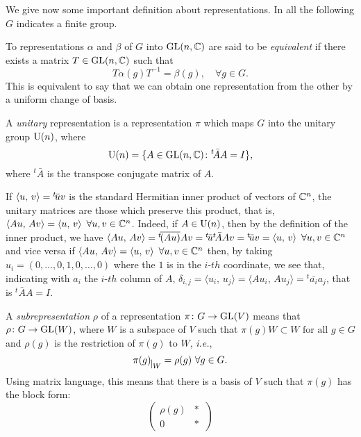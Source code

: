 We give now some important definition about representations. In all the following $G$ indicates a finite group.
\begin{defn}
\label{equiv:repres}
To representations $\alpha$ and $\beta$ of $G$ into $\operatorname{GL}(n,{\mathbb C})$ are said to be \emph{equivalent}
if there exists a matrix $T \in \operatorname{GL}(n,{\mathbb C})$ such that
\[
T\alpha(g)T^{-1}=\beta(g), \quad \forall g \in G.
\]
This is equivalent to say that we can obtain one representation from the other by a uniform change of basis.
\end{defn}

\begin{defn}
\label{def:unitary}
A \emph{unitary} representation is a representation $\pi$ which maps $G$ into the unitary group $\operatorname{U}(n)$, where 
\[
\operatorname{U}(n) =\{A\in \operatorname{GL}(n,{\mathbb C}) \colon {}^{t}\!\bar{A}A=I\},
\]
where ${}^{t}\!\bar{A}$ is the transpose conjugate matrix of $A$.
\end{defn}
\begin{rem}
If $\Braket{u, \, v} = {}^t\!\bar{u}v$ is the standard Hermitian inner product of vectors of ${\mathbb C}^{n}$, the unitary matrices are those which preserve this product, that is, $\Braket{Au, \, Av} =\Braket{u, \, v} \ \forall u,v \in {\mathbb C}^{n}$.
Indeed, if $A \in \operatorname{U}(n)$, then by the definition of the inner product, we have $\Braket{Au, \, Av}={}^{t}\!\overline{(Au)}Av={}^t\!\bar{u}{}^t\!\bar{A}Av={}^t\!\bar{u}v=\Braket{u,\, v} \ \forall u,v \in {\mathbb C}^{n}$ and vice versa if $\Braket{Au, \, Av} =\Braket{u, \, v} \ \forall u,v \in {\mathbb C}^{n}$ then, by taking $u_i=(0,\dots ,0, 1, 0,\dots , 0)$ where the $1$ is in the $i$-$th$ coordinate, we see that, indicating with $a_i$ the $i$-$th$ column of $A$, $\delta_{i,j}=\langle u_i, \, u_j\rangle =\langle Au_i, \, Au_j\rangle={}^t\!\bar{a_i}a_j$, that is ${}^{t}\!\bar{A}A=I$.
\end{rem}
\begin{defn}
A \emph{subrepresentation} $\rho$ of a representation $\pi\colon G \rightarrow \operatorname{GL}(V)$ means that $\rho\colon G \rightarrow \operatorname{GL}(W)$, where $W$ is a subspace of $V$ such that $\pi(g)W\subset W \text{ for all }g \in G$ and $\rho(g)$ is the restriction of $\pi(g)$ to $W$, \emph{i.e.},
\[
\pi(g)_{\mkern 1mu \vrule height 2ex\mkern2mu W}= \rho(g)\ \forall g \in G.
\]
Using matrix language, this means that there is a basis of $V$ such that $\pi(g)$ has the block form:
\[
\begin{pmatrix}
\rho(g) & \ast \ \\
0 & \ast \
\end{pmatrix}
\]
\end{defn}
